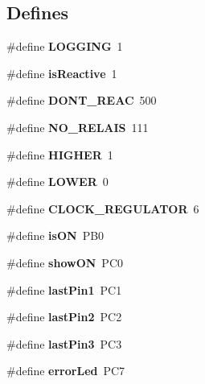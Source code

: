 \subsection*{\-Defines}
\begin{DoxyCompactItemize}
\item 
\#define {\bfseries \-L\-O\-G\-G\-I\-N\-G}~1\label{defaults_8h_a24a31f60b063af0e662125ea2427b140}

\item 
\#define {\bfseries is\-Reactive}~1\label{defaults_8h_aaeddf4eb1262af3ef8976e5ad364e6a9}

\item 
\#define {\bfseries \-D\-O\-N\-T\-\_\-\-R\-E\-A\-C}~500\label{defaults_8h_a352068e8b891cd22fd8052b245dcbc18}

\item 
\#define {\bfseries \-N\-O\-\_\-\-R\-E\-L\-A\-I\-S}~111\label{defaults_8h_a47d88f393f337c3ac8e1190557cd3877}

\item 
\#define {\bfseries \-H\-I\-G\-H\-E\-R}~1\label{defaults_8h_a4c48324c04ea9396e387804b3525b64b}

\item 
\#define {\bfseries \-L\-O\-W\-E\-R}~0\label{defaults_8h_aaa9295df3f8f6033cae4b89cc7e5ff29}

\item 
\#define {\bfseries \-C\-L\-O\-C\-K\-\_\-\-R\-E\-G\-U\-L\-A\-T\-O\-R}~6\label{defaults_8h_aae0405d1907d9d3f2909040d06501c19}

\item 
\#define {\bfseries is\-O\-N}~\-P\-B0\label{defaults_8h_a0ebfe28acae77f48bc08b00db7f63ce7}

\item 
\#define {\bfseries show\-O\-N}~\-P\-C0\label{defaults_8h_a5cee39fe24546f865fc67ea6e75c2695}

\item 
\#define {\bfseries last\-Pin1}~\-P\-C1\label{defaults_8h_a092ffa50805e39ac18b4037881f68ed6}

\item 
\#define {\bfseries last\-Pin2}~\-P\-C2\label{defaults_8h_a847d94c1469aaf941445086322852548}

\item 
\#define {\bfseries last\-Pin3}~\-P\-C3\label{defaults_8h_a4de283d337c22570958fdce566c7a8bb}

\item 
\#define {\bfseries error\-Led}~\-P\-C7\label{defaults_8h_aec42b79feae93683917372189862f491}


\end{DoxyCompactItemize}
